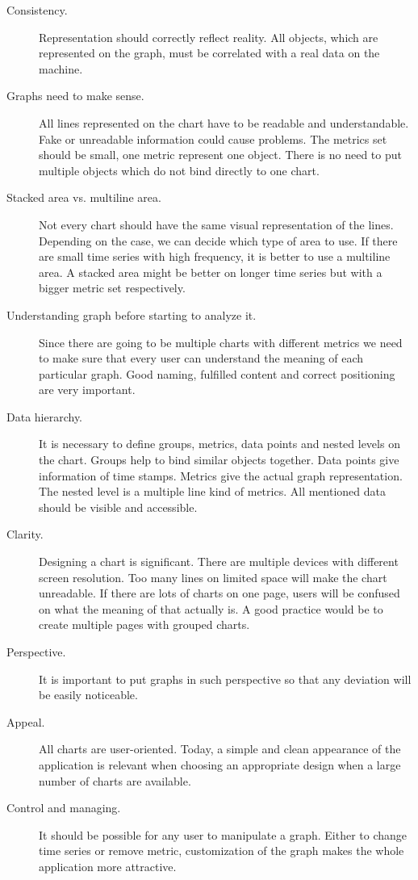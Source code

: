 \begin{description}
\item[Consistency.] Representation should correctly reflect reality. All objects, which are represented on the graph, must be correlated with a real data on the machine. 
\item[Graphs need to make sense.]  All lines represented on the chart have to be readable and understandable. Fake or unreadable information could cause problems. The metrics set should be small, one metric represent one object. There is no need to put multiple objects which do not bind directly to one chart.
\item[Stacked area vs. multiline area.] Not every chart should have the same visual representation of the lines. Depending on the case, we can decide which type of area to use. If there are small time series with high frequency, it is better to use a multiline area. A stacked area might be better on longer time series but with a bigger metric set respectively. 
\item[Understanding graph before starting to analyze it. ] Since there are going to be multiple charts with different metrics we need to make sure that every user can understand the meaning of each particular graph. Good naming, fulfilled content and correct positioning are very important.
\item[Data hierarchy. ] It is necessary to define groups, metrics, data points and nested levels on the chart.  Groups help to bind similar objects together. Data points give information of time stamps. Metrics give the actual graph representation. The nested level is a multiple line kind of metrics. All mentioned data should be visible and accessible. 
\item[Clarity.] Designing a chart is significant. There are multiple devices with different screen resolution. Too many lines on limited space will make the chart unreadable. If there are lots of charts on one page, users will be confused on what the meaning of that actually is. A good practice would be to create multiple pages with grouped charts. 
\item[Perspective.] It is important to put graphs in such perspective so that any deviation will be easily noticeable. 
\item[Appeal.] All charts are user-oriented. Today, a simple and clean appearance of the application is relevant when choosing an appropriate design when a large number of charts are available.  
\item[Control and managing.] It should be possible for any user to manipulate a graph. Either to change time series or remove metric, customization of the graph makes the whole application more attractive.
\end{description}

